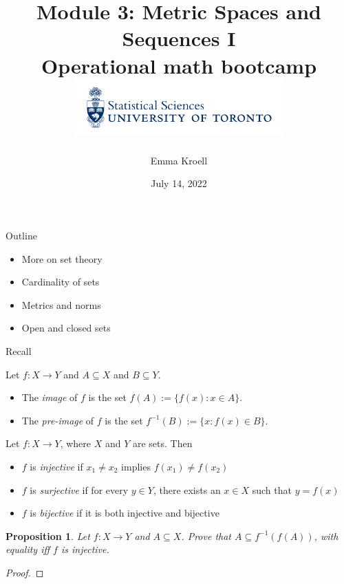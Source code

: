 \documentclass [aspectratio=169]{beamer}
\title[]{Module 3: Metric Spaces and Sequences I \\ {\large Operational math bootcamp}\\ \includegraphics[width=8cm]{dept_logo.png}\vspace{-1em}}
\author[]{Emma Kroell}
\institute[]{University of Toronto}
\date{July 14, 2022}
\newtheorem{proposition}[theorem]{Proposition}
\begin{document}
{
\begin{frame}
    \titlepage
\end{frame}
}

\begin{frame}{Outline}
    \begin{itemize}
      \setlength\itemsep{1em}
    	\item More on set theory
	\item Cardinality of sets
	\item Metrics and norms
	\item Open and closed sets
    \end{itemize}
\end{frame}

\begin{frame}{Recall}
\begin{definition}
Let $f:X \to Y$ and $A \subseteq X$ and $B \subseteq Y$. 
\begin{itemize}
\item The \emph{image} of $f$ is the set $f(A) := \{f(x): x \in A \}$.
\item The \emph{pre-image} of $f$ is the set $f^{-1}(B) := \{x: f(x) \in B \}$.
\end{itemize}
\end{definition}


\begin{definition}
Let $f:X \to Y$, where $X$ and $Y$ are sets. Then
\begin{itemize}
    \item $f$ is \emph{injective} if $x_1 \neq x_2$ implies $f(x_1) \neq f(x_2)$
    \item $f$ is \emph{surjective} if for every $y \in Y$, there exists an $x \in X$ such that $y = f(x)$
    \item $f$ is \emph{bijective} if it is both injective and bijective
\end{itemize}
\end{definition}

\end{frame}

\begin{frame}
\begin{proposition}
Let $f: X \to Y$ and $A \subseteq X$. Prove that $A \subseteq f^{-1}(f(A))$, with equality iff $f$ is injective. 
\end{proposition}
\begin{proof}

\vspace{4cm}
\end{proof}

\end{frame}
\end{document}
